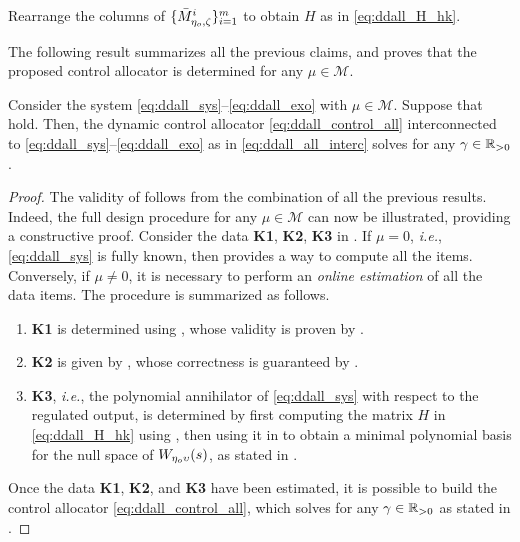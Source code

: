 \begin{algorithm}[h!]
\begin{algorithmic}[1]
    \State Rearrange the columns of $\{\bar{M}^{i}_{\eta_o,\zeta}\}_{i=1}^m$ to obtain $H$ as in \eqref{eq:ddall_H_hk}.
  \end{algorithmic}
\end{algorithm}

The following result summarizes all the previous claims, and proves that the proposed control allocator is determined for any $\mu\in\mathcal{M}$.

\begin{theorem}
  \label{thm:ddall_main}
  Consider the system \eqref{eq:ddall_sys}--\eqref{eq:ddall_exo} with $\mu\in\mathcal{M}$. Suppose that  hold. Then, the dynamic control allocator \eqref{eq:ddall_control_all} interconnected to \eqref{eq:ddall_sys}--\eqref{eq:ddall_exo} as in \eqref{eq:ddall_all_interc} solves  for any $\gamma\in\mathbb{R}_{>0}$.\closestatement
\end{theorem}
\begin{proof}
  The validity of  follows from the combination of all the previous results. Indeed, the full design procedure for any $\mu\in\mathcal{M}$ can now be illustrated, providing a constructive proof.
  Consider the data \textbf{K1}, \textbf{K2}, \textbf{K3} in .
  If $\mu=0$, \emph{i.e.}, \eqref{eq:ddall_sys} is fully known, then  provides a way to compute all the items.
  Conversely, if $\mu\neq 0$, it is necessary to perform an \emph{online estimation} of all the data items. The procedure is summarized as follows.
  \begin{enumerate}
    \item \textbf{K1} is determined using , whose validity is proven by .
    \item \textbf{K2} is given by , whose correctness is guaranteed by .
    \item \textbf{K3}, \emph{i.e.}, the polynomial annihilator of \eqref{eq:ddall_sys} with respect to the regulated output, is determined by first computing the matrix $H$ in \eqref{eq:ddall_H_hk} using , then using it in  to obtain a minimal polynomial basis for the null space of $W_{\eta_o\upsilon}(s)$, as stated in .
  \end{enumerate}
  Once the data \textbf{K1}, \textbf{K2}, and \textbf{K3} have been estimated, it is possible to build the control allocator \eqref{eq:ddall_control_all}, which solves  for any $\gamma\in\mathbb{R}_{>0}$ as stated in .
\end{proof}


